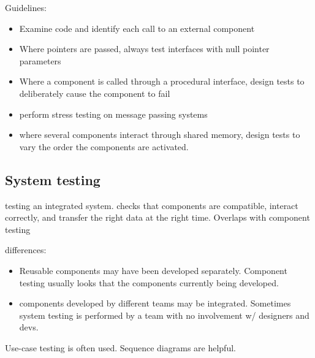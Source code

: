 \documentclass{article}
\begin{document}
    Guidelines:
    \begin{itemize}
        \item Examine code and identify each call to an external component 
        \item Where pointers are passed, always test interfaces with null pointer parameters
        \item Where a component is called through a procedural interface, design tests to 
        deliberately cause the component to fail
        \item perform stress testing on message passing systems 
        \item where several components interact through shared memory, design tests to vary
        the order the components are activated.
    \end{itemize}

    \subsection*{System testing}

    testing an integrated system. checks that components are compatible, interact 
    correctly, and transfer the right data at the right time. Overlaps with component testing 

    differences:
    \begin{itemize}
        \item Reusable components may have been developed separately. Component testing
        usually looks that the components currently being developed.
        \item components developed by different teams may be integrated. Sometimes 
        system testing is performed by a team with no involvement w/ designers and devs.
    \end{itemize}

    Use-case testing is often used. Sequence diagrams are helpful.
\end{document}
